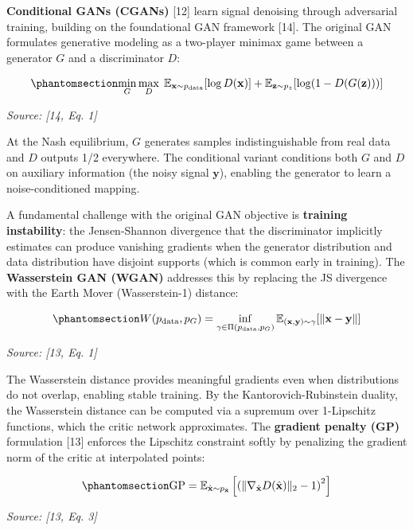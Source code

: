 \textbf{Conditional GANs (CGANs)} {[}12{]} learn signal denoising through adversarial training, building on the foundational GAN framework {[}14{]}. The original GAN formulates generative modeling as a two-player minimax game between a generator \(G\) and a discriminator \(D\):

\begin{equation}\protect\phantomsection\label{eq:gan-minimax}{\min_G \max_D \; \mathbb{E}_{\mathbf{x} \sim p_{\text{data}}}[\log D(\mathbf{x})] + \mathbb{E}_{\mathbf{z} \sim p_z}[\log(1 - D(G(\mathbf{z})))]
}\end{equation} \par{\small\textit{Source: [14, Eq. 1]}}

At the Nash equilibrium, \(G\) generates samples indistinguishable from real data and \(D\) outputs 1/2 everywhere. The conditional variant conditions both \(G\) and \(D\) on auxiliary information (the noisy signal \(\mathbf{y}\)), enabling the generator to learn a noise-conditioned mapping.

A fundamental challenge with the original GAN objective is \textbf{training instability}: the Jensen-Shannon divergence that the discriminator implicitly estimates can produce vanishing gradients when the generator distribution and data distribution have disjoint supports (which is common early in training). The \textbf{Wasserstein GAN (WGAN)} addresses this by replacing the JS divergence with the Earth Mover (Wasserstein-1) distance:

\begin{equation}\protect\phantomsection\label{eq:wasserstein-distance}{W(p_{\text{data}}, p_G) = \inf_{\gamma \in \Pi(p_{\text{data}}, p_G)} \mathbb{E}_{(\mathbf{x}, \mathbf{y}) \sim \gamma}[\|\mathbf{x} - \mathbf{y}\|]
}\end{equation} \par{\small\textit{Source: [13, Eq. 1]}}

The Wasserstein distance provides meaningful gradients even when distributions do not overlap, enabling stable training. By the Kantorovich-Rubinstein duality, the Wasserstein distance can be computed via a supremum over 1-Lipschitz functions, which the critic network approximates. The \textbf{gradient penalty (GP)} formulation {[}13{]} enforces the Lipschitz constraint softly by penalizing the gradient norm of the critic at interpolated points:

\begin{equation}\protect\phantomsection\label{eq:gradient-penalty}{\text{GP} = \mathbb{E}_{\hat{\mathbf{x}} \sim p_{\hat{\mathbf{x}}}}\left[\left(\|\nabla_{\hat{\mathbf{x}}} D(\hat{\mathbf{x}})\|_2 - 1\right)^2\right]
}\end{equation} \par{\small\textit{Source: [13, Eq. 3]}}

